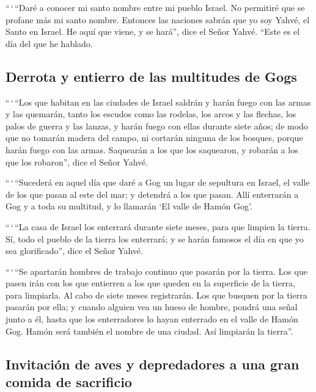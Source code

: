  ``\,`\,``Daré a conocer mi santo nombre entre mi pueblo
Israel. No permitiré que se profane más mi santo nombre. Entonces las
naciones sabrán que yo soy Yahvé, el Santo en Israel.  He
aquí que viene, y se hará'', dice el Señor Yahvé. ``Este es el día del
que he hablado.

\hypertarget{derrota-y-entierro-de-las-multitudes-de-gogs}{%
\subsection{Derrota y entierro de las multitudes de
Gogs}\label{derrota-y-entierro-de-las-multitudes-de-gogs}}

 ``\,`\,``Los que habitan en las ciudades de Israel
saldrán y harán fuego con las armas y las quemarán, tanto los escudos
como las rodelas, los arcos y las flechas, los palos de guerra y las
lanzas, y harán fuego con ellas durante siete años;  de
modo que no tomarán madera del campo, ni cortarán ninguna de los
bosques, porque harán fuego con las armas. Saquearán a los que los
saquearon, y robarán a los que los robaron'', dice el Señor Yahvé.

 ``\,`\,``Sucederá en aquel día que daré a Gog un lugar
de sepultura en Israel, el valle de los que pasan al este del mar; y
detendrá a los que pasan. Allí enterrarán a Gog y a toda su multitud, y
lo llamarán `El valle de Hamón Gog'.

 ``\,`\,``La casa de Israel los enterrará durante siete
meses, para que limpien la tierra.  Sí, todo el pueblo de
la tierra los enterrará; y se harán famosos el día en que yo sea
glorificado'', dice el Señor Yahvé.

 ``\,`\,``Se apartarán hombres de trabajo continuo que
pasarán por la tierra. Los que pasen irán con los que entierren a los
que queden en la superficie de la tierra, para limpiarla. Al cabo de
siete meses registrarán.  Los que busquen por la tierra
pasarán por ella; y cuando alguien vea un hueso de hombre, pondrá una
señal junto a él, hasta que los enterradores lo hayan enterrado en el
valle de Hamón Gog.  Hamón será también el nombre de una
ciudad. Así limpiarán la tierra''.

\hypertarget{invitaciuxf3n-de-aves-y-depredadores-a-una-gran-comida-de-sacrificio}{%
\subsection{Invitación de aves y depredadores a una gran comida de
sacrificio}\label{invitaciuxf3n-de-aves-y-depredadores-a-una-gran-comida-de-sacrificio}}

